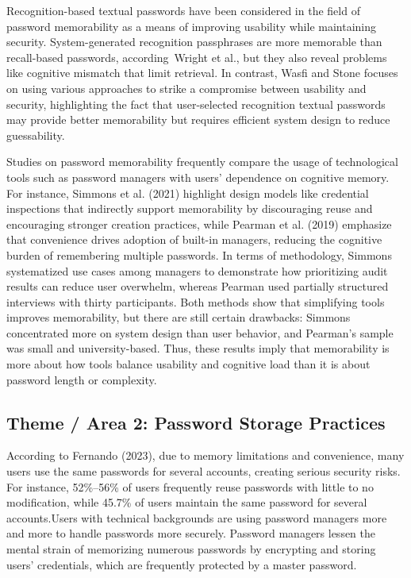 \documentclass[12pt,a4paper]{article}
\begin{document}
\vspace{0.4cm}

Recognition-based textual passwords have been considered in the field of password memorability as a means of improving usability while maintaining security. System-generated recognition passphrases are more memorable than recall-based passwords, according Wright et al., but they also reveal problems like cognitive mismatch that limit retrieval. 
In contrast, Wasfi and Stone focuses on using various approaches to strike a compromise between usability and security, highlighting the fact that user-selected recognition textual passwords may provide better memorability but requires efficient system design to reduce guessability.

\vspace{0.4cm}

Studies on password memorability frequently compare the usage of technological tools such as password managers with users' dependence on cognitive memory. For instance, Simmons et al. (2021) highlight design models like credential inspections that indirectly support memorability by discouraging reuse and encouraging stronger creation practices, while Pearman et al. (2019) emphasize that convenience drives adoption of built-in managers, reducing the cognitive burden of remembering multiple passwords. In terms of methodology, Simmons systematized use cases among managers to demonstrate how prioritizing audit results can reduce user overwhelm, whereas Pearman used partially structured interviews with thirty participants. Both methods show that simplifying tools improves memorability, but there are still certain drawbacks: Simmons concentrated more on system design than user behavior, and Pearman's sample was small and university-based.
Thus, these results imply that memorability is more about how tools balance usability and cognitive load than it is about password length or complexity.

\subsection{Theme / Area 2: Password Storage Practices}

According to Fernando (2023), due to memory limitations and convenience, many users use the same passwords for several accounts, creating serious security risks. For instance, 52\%–56\% of users frequently reuse passwords with little to no modification, while 45.7\% of users maintain the same password for several accounts.Users with technical backgrounds are using password managers more and more to handle passwords more securely. Password managers lessen the mental strain of memorizing numerous passwords by encrypting and storing users' credentials, which are frequently protected by a master password.
\end{document}
